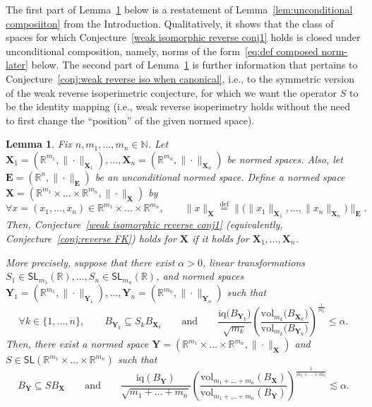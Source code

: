\documentclass[11pt,reqno]{amsart}
\renewcommand{\le}{\leqslant}
\newcommand{\n}{\{1,\ldots,n\}}
\newcommand{\X}{\mathbf X}
\newcommand{\Y}{\mathbf Y}
\newcommand{\R}{\mathbb R}
\newtheorem{lemma}[theorem]{Lemma}
\theoremstyle{remark}
\newcommand{\iq}{\mathrm{iq}}
\newcommand{\SL}{\mathsf{SL}}
\renewcommand{\subset}{\subseteq}
\newcommand{\N}{\mathbb N}
\newcommand{\eqdef}{\stackrel{\mathrm{def}}{=}}
\newcommand{\vol}{\mathrm{vol}}
\renewcommand{\1}{\mathbf 1}
\newcommand{\bfE}{\mathbf{E}}
\begin{document}
The first part of Lemma~\ref{lem:unconditional composiiton-later} below is a restatement of Lemma~\ref{lem:unconditional composiiton} from the Introduction. Qualitatively, it shows that the class of spaces for which Conjecture~\ref{weak isomorphic reverse conj1} holds is closed under unconditional composition, namely, norms of the form~\eqref{eq:def composed norm-later} below. The second part of Lemma~\ref{lem:unconditional composiiton-later} is further information that pertains to Conjecture~\ref{conj:weak reverse iso when canonical}, i.e., to the symmetric version of the weak reverse isoperimetric conjecture, for which we want the operator $S$ to be the identity mapping (i.e., weak reverse isoperimetry holds without the need to first change the ``position'' of the given normed space).

\begin{lemma}\label{lem:unconditional composiiton-later} Fix $n,m_1,\ldots,m_n\in \N$. Let $\X_1=(\R^{m_1},\|\cdot\|_{\X_1}),\ldots,\X_n=(\R^{m_n},\|\cdot\|_{\X_{n}})$ be normed spaces. Also, let $\bfE=(\R^n,\|\cdot\|_\bfE)$ be an unconditional normed space. Define a normed space $\X=(\R^{m_1}\times\ldots\times \R^{m_n},\|\cdot\|_\X)$ by
\begin{equation}\label{eq:def composed norm-later}
\forall x=(x_1,\ldots,x_n)\in \R^{m_1}\times\ldots\times \R^{m_n},\qquad \|x\|_\X\eqdef \big\|\big(\|x_1\|_{\X_1},\ldots,\|x_n\|_{\X_n}\big)\big\|_\bfE.
\end{equation}
Then,  Conjecture~\ref{weak isomorphic reverse conj1} (equivalently, Conjecture~\ref{conj:reverse FK}) holds for $\X$ if it holds for $\X_1,\ldots,\X_n$.

More precisely, suppose that there exist $\alpha>0$, linear transformations  $S_1\in \SL_{m_1}(\R),\ldots,S_n\in \SL_{m_n}(\R)$, and normed spaces $\Y_1=(\R^{m_1},\|\cdot\|_{\Y_1}),\ldots,\Y_n=(\R^{m_n},\|\cdot\|_{\Y_{n}})$ such that
\begin{equation}\label{eq:Yk assumption less alpha}
\forall k\in \n,\qquad B_{\Y_k}\subset S_kB_{\X_k}\qquad\mathrm{and}\qquad \frac{\iq\big(B_{\Y_k}\big)}{\sqrt{m_k}}\left(\frac{\vol_{m_k}\big(B_{\X_k}\big)}{\vol_{m_k}\big(B_{\Y_k}\big)}\right)^{\frac{1}{m_k}}\le \alpha.
\end{equation}
Then, there exist a normed space $\Y=(\R^{m_1}\times\ldots\times \R^{m_n},\|\cdot\|_\X)$ and $S\in \SL(\R^{m_1}\times\ldots\times \R^{m_n})$ such that
\begin{equation}\label{eq:Y conclusion composition}
B_\Y\subset S B_\X\qquad \mathrm{and}\qquad \frac{\iq(B_{\Y})}{\sqrt{m_1+\ldots+m_n}}\left(\frac{\vol_{m_1+\ldots+m_n}(B_{\X})}{\vol_{m_1+\ldots+m_n}(B_{\Y})}\right)^{\frac{1}{m_1+\ldots+m_n}}\lesssim \alpha.
\end{equation}


\end{lemma}
\end{document}
